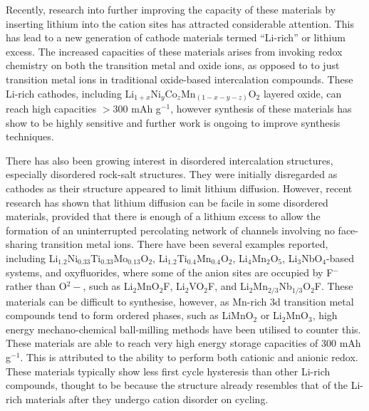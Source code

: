 \documentclass[../main.tex]{subfiles}
\begin{document}
Recently, research into further improving the capacity of these materials by inserting lithium into the cation sites has attracted considerable attention. This has lead to a new generation of cathode materials termed ``Li-rich'' or lithium excess. The increased capacities of these materials arises from invoking redox chemistry on both the transition metal and oxide ions, as opposed to to just transition metal ions in traditional oxide-based intercalation compounds. \cite{Sathiya2013,lee2014unlocking,Oishi2015,Seo2016,Gent2017,Assat2018,naylor2019depth,House2020,House2020a} These Li-rich cathodes, including Li$_{1+x}$Ni$_y$Co$_z$Mn$_{(1-x-y-z)}$O$_2$ layered oxide, can reach high capacities $>300$ mAh g$^{-1}$, however synthesis of these materials has show to be highly sensitive and further work is ongoing to improve synthesis techniques.\cite{Hy2016} 

There has also been growing interest in disordered intercalation structures, especially disordered rock-salt structures. They were initially disregarded as cathodes as their structure appeared to limit lithium diffusion. However, recent research has shown that lithium diffusion can be facile in some disordered materials, provided that there is enough of a lithium excess to allow the formation of an uninterrupted percolating network of channels involving no face-sharing transition metal ions.\cite{lee2014unlocking,Urban2014,Lee2015} There have been several examples reported, including Li$_{1.2}$Ni$_{0.33}$Ti$_{0.33}$Mo$_{0.13}$O$_2$,\cite{Lee2015} Li$_{1.2}$Ti$_{0.4}$Mn$_{0.4}$O$_2$,\cite{Yabuuchi2016a} Li$_4$Mn$_2$O$_5$,\cite{Freire2016,Yao2018,Bhandari2019454} Li$_3$NbO$_4$-based systems,\cite{Nakajima2017,Yabuuchi2015,Wang2015} and oxyfluorides, where some of the anion sites are occupied by F$^-$ rather than O$^2-$, such as Li$_2$MnO$_2$F,\cite{Sharpe2020,House2018,Lun2020} Li$_2$VO$_2$F,\cite{Chen2015,Chen2015a,Baur2019, Cambaz2019, Baur2020, Kallquist2019, Chang2020} and Li$_2$Mn$_{2/3}$Nb$_{1/3}$O$_2$F.\cite{Lee2018} These materials can be difficult to synthesise, however, as Mn-rich 3d transition metal compounds tend to form ordered phases, such as LiMnO$_2$ or Li$_2$MnO$_3$, high energy mechano-chemical ball-milling methods have been utilised to counter this.\cite{Freire2016,House2018,Freire2017} These materials are able to reach very high energy storage capacities of $300$ mAh g$^{-1}$. \cite{Jacquet2019} This is attributed to the ability to perform both cationic and anionic redox. \cite{Jacquet2019,clement2020,Chang2020} These materials typically show less first cycle hysteresis than other Li-rich compounds, thought to be because the structure already resembles that of the Li-rich materials after they undergo cation disorder on cycling.
\end{document}
